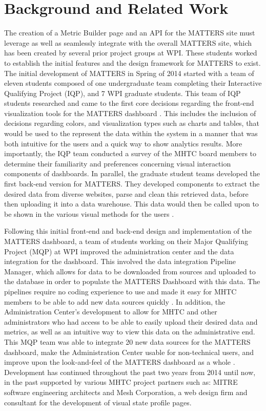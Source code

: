 \chapter{Background and Related Work}

	The creation of a Metric Builder page and an API for the MATTERS site must 
	leverage as well as seamlessly integrate with the overall MATTERS site, 
	which has been created by several prior project groups at WPI. These 
	students worked to establish the initial features and the design framework 
	for MATTERS to exist. The initial development of MATTERS in Spring of 2014 
	started with a team of eleven students composed of one undergraduate team 
	completing their Interactive Qualifying Project (IQP), and 7 WPI graduate 
	students. This team of IQP students researched and came to the first core 
	decisions regarding the front-end visualization tools for the MATTERS 
	dashboard \cite{prevreport}. This includes the inclusion of decisions 
	regarding colors, and visualization types such as charts and tables, that 
	would be used to the represent the data within the system in a manner that 
	was both intuitive for the users and a quick way to show analytics results. 
	More importantly, the IQP team conducted a survey of the MHTC board members 
	to determine their familiarity and preferences concerning visual interaction 
	components of dashboards. In parallel, the graduate student teams developed 
	the first back-end version for MATTERS. They developed components to extract 
	the desired data from diverse websites, parse and clean this retrieved data, 
	before then uploading it into a data warehouse. This data would then be 
	called upon to be shown in the various visual methods for the users 
	\cite{iqp}.

	Following this initial front-end and back-end design and implementation of 
	the MATTERS dashboard, a team of students working on their Major Qualifying 
	Project (MQP) at WPI improved the administration center and the data 
	integration for the dashboard. This involved the data integration Pipeline 
	Manager, which allows for data to be downloaded from sources and uploaded to the database in order to populate the MATTERS Dashboard with this data. The pipelines require no coding experience to use and made it easy for MHTC members to be able to add new data sources quickly \cite{prevreport}. In addition, the Administration Center's development to allow for 
	MHTC and other administrators who had access to be able to easily upload 
	their desired data and metrics, as well as an intuitive way to view this 
	data on the administrative end. This MQP team was able to integrate 20 new 
	data sources for the MATTERS dashboard, make the Administration Center 
	usable for non-technical users, and improve upon the look-and-feel of the 
	MATTERS dashboard as a whole \cite{iqp}. Development has continued throughout the past two years from 2014 until now, in the past supported by various MHTC project partners such as: MITRE software engineering architects and Mesh Corporation, a web design firm and consultant for the development of visual state profile pages. 


